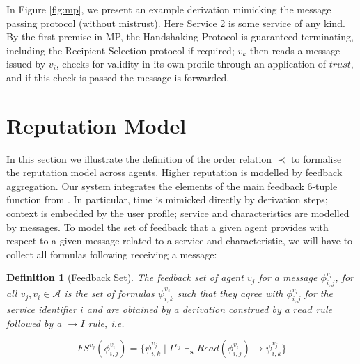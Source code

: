 \documentclass[compsoc, conference, letterpaper, 10pt, times]{IEEEtran}
\newtheorem{definition}{Definition}
\begin{document}
In Figure \ref{fig:mp}, we present an example derivation mimicking the message passing protocol (without mistrust). Here Service 2 is some service of any kind. By the first premise in MP, the Handshaking Protocol is guaranteed terminating, including the Recipient Selection protocol if required; $v_{k}$ then reads a message issued by $v_{i}$, checks for validity in its own profile through an application of $trust$, and if this check is passed the message is forwarded.



\begin{figure*}
	\begin{prooftree}
		\end{prooftree}

	\caption{The Message Passing Protocol}\label{fig:mp}
\end{figure*}




\section{Reputation Model}\label{sec:reputation}

In this section we illustrate the definition of the order relation $\prec$ to formalise the reputation model across agents. Higher reputation is modelled by feedback aggregation. Our system integrates the elements of the main feedback 6-tuple function from \cite{glenford}. In particular, time is mimicked directly by derivation steps; context is embedded by the user profile; service and characteristics are modelled by messages. To model the set of feedback that a given agent provides with respect to a given message related to a service and characteristic, we will have to collect all formulas following receiving a message:

\begin{definition}[Feedback Set]
The feedback set of agent $v_{j}$ for a message $\phi^{v_{i}}_{i,j}$, for all $v_{j}, v_{i} \in \mathcal{A}$ is the set of formulas $\psi^{v_{j}}_{i,k}$ such that they agree with $\phi^{v_{i}}_{i,j}$ for the service identifier $i$ and are obtained by a derivation construed by a $read$ rule followed by a $\rightarrow I$ rule, i.e.

\[
FS^{v_{j}}(\phi^{v_{i}}_{i,j})=\{ \psi^{v_{j}}_{i,k}\mid \Gamma^{v_{j}}
\vdash_{\mathtt{s}}  Read(\phi^{v_{i}}_{i,j})\rightarrow \psi^{v_{j}}_{i,k}  \}
\]

\end{definition}
\end{document}
